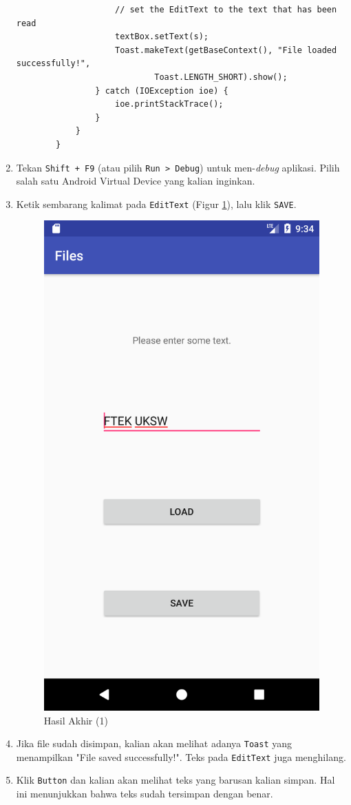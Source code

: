 \documentclass{scrartcl}
\begin{document}
\begin{enumerate}
\begin{verbatim}
					// set the EditText to the text that has been read
					textBox.setText(s);
					Toast.makeText(getBaseContext(), "File loaded successfully!",
							Toast.LENGTH_SHORT).show();
				} catch (IOException ioe) {
					ioe.printStackTrace();
				}
			}
		}
		\end{verbatim}
		
		\item Tekan \texttt{Shift + F9} (atau pilih \texttt{Run > Debug}) untuk men-\textit{debug} aplikasi. Pilih salah satu Android Virtual Device yang kalian inginkan.
		
		\item Ketik sembarang kalimat pada \texttt{EditText} (Figur \ref{fig:screenshot_1497494069}), lalu klik \texttt{SAVE}.
		\begin{figure}[htbp]
			\centering
			\begin{minipage}{.5\textwidth}
				\centering
				\includegraphics[width=0.7\linewidth]{Screenshot_1497494069}
				\caption{Hasil Akhir (1)}
				\label{fig:screenshot_1497494069}
			\end{minipage}%
		\end{figure}
		\item Jika file sudah disimpan, kalian akan melihat adanya \texttt{Toast} yang menampilkan "File saved successfully!". Teks pada \texttt{EditText} juga menghilang.
		
		\item Klik \texttt{Button} dan kalian akan melihat teks yang barusan kalian simpan. Hal ini menunjukkan bahwa teks sudah tersimpan dengan benar.
		
	\end{enumerate}
\end{document}
